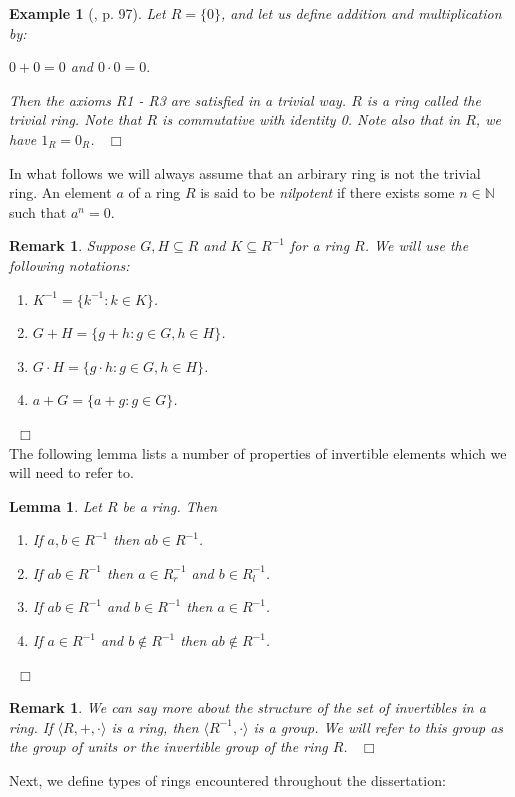 \documentclass[12pt, oneside]{book}
\newtheorem{lemma}[theorem]{Lemma}
\newtheorem{example}[theorem]{Example}
\newtheorem{remark}[theorem]{Remark}
\newcommand{\qed}{\hfill ~$\Box$\\}
\begin{document}
\begin{example} [\cite{G1}, p. 97]
\normalfont
\noindent Let $R = \{0\}$, and let us define addition and multiplication by:
\begin{center}
$0 + 0 = 0$ \quad and \quad $0 \cdot 0 = 0.$
\end{center}
\noindent Then the axioms R1 - R3 are satisfied in a trivial way. $R$ is a ring called the 
{\sl trivial ring}. Note that $R$ is commutative with identity 0. Note also that in $R$, we have 
$1_R = 0_R$. \qed
\end{example}
In what follows we will always assume that an arbirary ring is not the trivial ring. 
\vskip 0.3cm
\noindent An element $a$ of a ring $R$ is said to be {\sl nilpotent} if there exists some 
$n \in \mathbb{N}$ such that $a^{n}=0$.
\begin{remark}
\normalfont
\noindent Suppose $G, H \subseteq R$ and $K \subseteq R^{-1}$ for a ring $R$. 
We will use the following notations:
\begin{enumerate}[label=(\alph*)] 
\item $K^{-1} = \{k^{-1} : k \in K \}$.
\item $G + H = \{g + h : g \in G, h \in H \}$.
\item $G \cdot H = \{ g \cdot h : g \in G, h \in H \}$.
\item $a + G = \{a + g : g \in G \}$.
\end{enumerate}
\end{remark}
\qed
\noindent The following lemma lists a number of properties of invertible elements which we 
will need to refer to.
\begin{lemma} \label{RInverseStructure1}
\normalfont
Let $R$ be a ring. Then

\begin{enumerate}[label=(\alph*)]
\item If $a,b \in R^{-1}$ then $ab \in R^{-1}$.
\item If $ab \in R^{-1}$ then $a \in R_r^{-1}$ and $b \in R_l^{-1}$.
\item If $ab \in R^{-1}$ and $b \in R^{-1}$ then $a \in R^{-1}$.
\item If $a \in R^{-1}$ and $b \not \in R^{-1}$ then $ab \not \in R^{-1}$.
\end{enumerate}
\end{lemma}
\qed

\vspace{-0.5cm}
\begin{remark}
\normalfont
\noindent We can say more about the structure of the set of invertibles in a ring. 
If $\langle R, +, \cdot \rangle$ is a ring, then $\langle R^{-1}, \cdot \rangle$ is a group. 
We will refer to this group as the {\sl group of units} or {\sl the invertible group} of the ring $R$. \qed


\end{remark}
\noindent Next, we define types of rings encountered throughout the dissertation:
\end{document}
